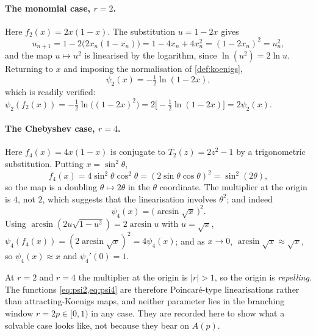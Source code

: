 \paragraph{The monomial case, $r=2$.}
Here $f_2(x) = 2x(1-x)$. The substitution $u = 1-2x$ gives
\begin{equation*}
u_{n+1} = 1 - 2\bigl(2x_n(1-x_n)\bigr) = 1-4x_n+4x_n^2 = (1-2x_n)^2 = u_n^2 ,
\end{equation*}
and the map $u\mapsto u^2$ is linearised by the logarithm, since
$\ln(u^2) = 2\ln u$. Returning to $x$ and imposing the normalisation of
\cref{def:koenigs},
\begin{equation}
\label{eq:psi2}
\psi_2(x) = -\tfrac12\ln(1-2x),
\end{equation}
which is readily verified:
$\psi_2(f_2(x)) = -\tfrac12\ln\bigl((1-2x)^2\bigr) = 2\bigl[-\tfrac12\ln(1-2x)\bigr] = 2\psi_2(x)$.

\paragraph{The Chebyshev case, $r=4$.}
Here $f_4(x) = 4x(1-x)$ is conjugate to $T_2(z) = 2z^2-1$ by a trigonometric
substitution. Putting $x = \sin^2\theta$,
\begin{equation*}
f_4(x) = 4\sin^2\theta\cos^2\theta = (2\sin\theta\cos\theta)^2 = \sin^2(2\theta),
\end{equation*}
so the map is a doubling $\theta\mapsto2\theta$ in the $\theta$ coordinate. The
multiplier at the origin is $4$, not $2$, which suggests that the linearisation
involves $\theta^2$; and indeed
\begin{equation}
\label{eq:psi4}
\psi_4(x) = \bigl(\arcsin\sqrt{x}\,\bigr)^2 .
\end{equation}
Using $\arcsin(2u\sqrt{1-u^2}) = 2\arcsin u$ with $u=\sqrt{x}$,
$\psi_4(f_4(x)) = (2\arcsin\sqrt{x})^2 = 4\psi_4(x)$; and as $x\to0$,
$\arcsin\sqrt{x}\approx\sqrt{x}$, so $\psi_4(x)\approx x$ and $\psi_4'(0)=1$.

\begin{remark}
\label{rem:attractrepel}
At $r=2$ and $r=4$ the multiplier at the origin is $|r|>1$, so the origin is
\emph{repelling}. The functions \cref{eq:psi2,eq:psi4} are therefore
Poincar\'e-type linearisations rather than attracting-Koenigs maps, and neither
parameter lies in the branching window $r=2p\in[0,1)$ in any case. They are recorded
here to show what a solvable case looks like, not because they bear on $A(p)$.
\end{remark}

